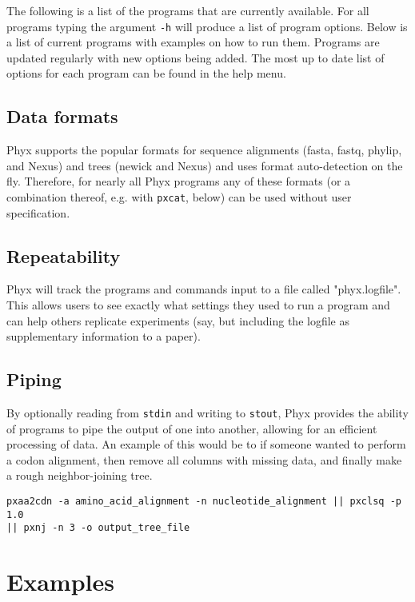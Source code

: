 \documentclass[12pt,letterpaper]{memoir}
\begin{document}
The following is a list of the programs that are currently available. For all programs typing the argument \texttt{-h} will produce a list of program options. Below is a list of current programs with examples on how to run them. Programs are updated regularly with new options being added. The most up to date list of options for each program can be found in the help menu.

\subsection{Data formats}

Phyx supports the popular formats for sequence alignments (fasta, fastq, phylip, and Nexus) and trees (newick and Nexus) and uses format auto-detection on the fly. Therefore, for nearly all Phyx programs any of these formats (or a combination thereof, e.g. with \texttt{pxcat}, below) can be used without user specification.

\subsection{Repeatability}

Phyx will track the programs and commands input to a file called "phyx.logfile". This allows users to see exactly what settings they used to run a program and can help others replicate experiments (say, but including the logfile as supplementary information to a paper).

\subsection{Piping}

By optionally reading from \texttt{stdin} and writing to \texttt{stout}, Phyx provides the ability of programs to pipe the output of one into another, allowing for an efficient processing of data. An example of this would be to if someone wanted to perform a codon alignment, then remove all columns with missing data, and finally make a rough neighbor-joining tree.
\begin{flushleft}
\begin{verbatim}
pxaa2cdn -a amino_acid_alignment -n nucleotide_alignment || pxclsq -p 1.0 
|| pxnj -n 3 -o output_tree_file
\end{verbatim}
\end{flushleft}

\section{Examples}
\end{document}
